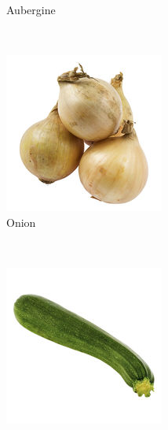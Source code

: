 \begin{figure}[t]
\begin{minipage}[b]{0.47\textwidth}
\begin{subfigure}[t]{0.32\textwidth}
			\caption{Aubergine}
			\label{subfig:clean-image-h}
		\end{subfigure}~
		\begin{subfigure}[t]{0.32\textwidth}
			\centering
			\includegraphics[width=\textwidth]{PaperA/clean-image-figure/Yellow-Onion_Clean.jpg}
			\caption{Onion}
			\label{subfig:clean-image-j}
		\end{subfigure}~
		\begin{subfigure}[t]{0.32\textwidth}
			\centering
			\includegraphics[width=\textwidth]{PaperA/clean-image-figure/Zucchini_Clean.jpg}

\end{subfigure}
\end{minipage}
\end{figure}
